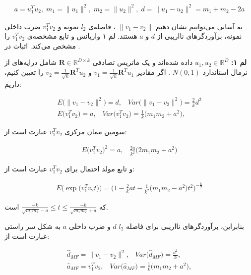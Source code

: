 \begin{align}
a= u_1^T u_2, \; m_1 = \|u_1 \|^2, \; m_2 = \| u_2 \|^2, \; d =  \| u_1 - u_2 \|^2 = m_1 + m_2 - 2a
\label{eq:1i7}
\end{align}

به آسانی می‌توانیم نشان دهیم 
$\| v_1 - v_2 \|$
، فاصله‌ی 
$l_2$
نمونه و 
$v_1^T v_2$
ضرب داخلی نمونه، برآوردگرهای نااریبی از 
$d$
و 
$a$
هستند. لم ۱ واریانس و تابع مشخصه‌ی 
$v_1^T v_2$
را مشخص می‌‌کند. اثبات در 
\cite{li2007stable}
.

\textbf{لم ۱:}
$u_1, u_2 \in \mathbb{R}^D$
داده شده‌اند و یک ماتریس تصادفی
$\mathbf{R} \in \mathbb{R}^{D \times k}$
شامل درایه‌های 
از نرمال استاندارد
$N(0,1)$
. اگر مقادیر 
$v_1 = \frac{1}{\sqrt{k}} \mathbf{R}^T u_1$
و 
$v_2 = \frac{1}{\sqrt{k}} \mathbf{R}^T u_2$
را تعیین کنیم، داریم:

\begin{align}
E \big(  \| v_1 - v_2 \|^2 \big) = d, \;\;\; \mathit{Var}\big(\| v_1 - v_2 \|^2\big) = \frac{2}{k} d^2  \label{eq:1i8}\\
E \big( v_1^T v_2 \big) = a, \;\;\; \mathit{Var} \big(v_1^T v_2 \big) =  \frac{1}{k} \big(m_1 m_2 + a^2\big), \label{eq:1i9}
\end{align}

سومین ممان مرکزی 
$v_1^T v_2$
عبارت است از:

\begin{align}
E \big( v_1^T v_2 \big)^2 = a, \;\;\; \frac{2a}{k^2} \big( 2 m_1 m_2 + a^2 \big)
\label{eq:1iA}
\end{align}

و تابع مولد احتمال برای 
$v_1^T v_2$
عبارت است از:

\begin{align}
E \big( \exp \big( v_1^T v_2 t \big) \big)
 = \bigg(  1 - \frac{2}{k} at - \frac{1}{k^2} \big( m_1 m_2 - a^2 \big) t^2 \bigg)^{- \frac{k}{2}}
\label{eq:1iB}
\end{align}

که 
$\frac{-k}{\sqrt{m_1 m_2} - a} \leq t \leq \frac{-k}{\sqrt{m_1 m_2} + a}$
است.

بنابراین، برآوردگرهای نااریبی برای فاصله 
$l_2$
$d$
و ضرب داخلی
$a$
به شکل سر راستی عبارت است از:

\begin{align}
\hat{d}_{MF} = \| v_1 - v_2 \|^2, \;\;\; \mathit{Var} \Big( \hat{d}_{MF} \Big) = \frac{d^2}{k}, \label{eq:1iC}\\
\hat{a}_{MF} = v_1^T v_2, \;\;\; \mathit{Var} \big( \hat{a}_{MF} \big) = \frac{1}{k} \big( m_1 m_2 + a^2 \big), \label{eq:1iD}
\end{align}

